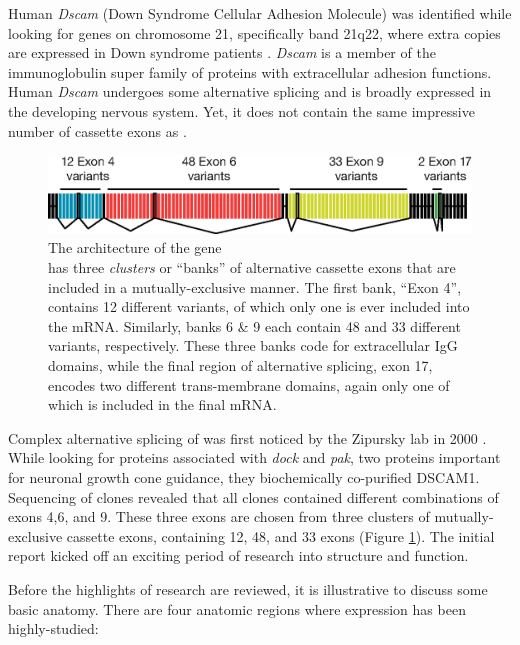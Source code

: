     Human \textit{Dscam} (Down Syndrome Cellular Adhesion Molecule) was identified while looking for genes on chromosome 21, specifically band 21q22, where extra copies are expressed in Down syndrome patients \citep{Yamakawa1998a}. \textit{Dscam} is a member of the immunoglobulin super family of proteins with extracellular adhesion functions. Human \textit{Dscam} undergoes some alternative splicing and is broadly expressed in the developing nervous system. Yet, it does not contain the same impressive number of cassette exons as \flies{} \dscam{}.

    \begin{figure} %
      \centering
      \includegraphics{Figures/Intro/DscamArch.eps}
      \caption[The architecture of the \flies{} gene \dscam{}]
      {
        The architecture of the \flies{} gene \dscam{}\\[0.25cm]
        \dscam{} has three \textit{clusters} or ``banks'' of alternative cassette exons that are included in a mutually-exclusive manner. The first bank, ``Exon 4'', contains 12 different variants, of which only one is ever included into the mRNA. Similarly, banks 6 \& 9 each contain 48 and 33 different variants, respectively. These three banks code for extracellular IgG domains, while the final region of alternative splicing, exon 17, encodes two different trans-membrane domains, again only one of which is included in the final mRNA.
          }
        \label{Intro:fig:DscamArch}
        \end{figure}

    Complex alternative splicing of \dscam{} was first noticed by the Zipursky lab in 2000 \citep{Schmucker2000}. While looking for proteins associated with \textit{dock} and \textit{pak}, two proteins important for neuronal growth cone guidance, they biochemically co-purified DSCAM1. Sequencing of \dscam{} clones revealed that all clones contained different combinations of exons 4,6, and 9. These three exons are chosen from three clusters of mutually-exclusive cassette exons, containing 12, 48, and 33 exons (Figure \ref{Intro:fig:DscamArch}). The initial report kicked off an exciting period of research into \dscam{} structure and function.

    Before the highlights of \dscam{} research are reviewed, it is illustrative to discuss some basic \flies{} anatomy. There are four anatomic regions where \dscam{} expression has been highly-studied:

